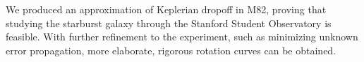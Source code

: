\documentclass[useAMS,usenatbib]{mn2e}
\begin{document}
We produced an approximation of Keplerian dropoff in M82, proving that studying the starburst galaxy through the Stanford Student Observatory is feasible. With further refinement to the experiment, such as minimizing unknown error propagation, more elaborate, rigorous rotation curves can be obtained.


















\label{lastpage}
\end{document}
